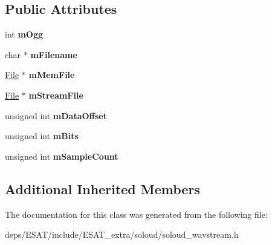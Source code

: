 \subsection*{Public Attributes}
\begin{DoxyCompactItemize}
\item 
\mbox{\label{class_so_loud_1_1_wav_stream_a2dcf2c2ca18a7002c508628a470b55cd}} 
int {\bfseries m\+Ogg}
\item 
\mbox{\label{class_so_loud_1_1_wav_stream_abb044202f928f511f5b8904ea5372915}} 
char $\ast$ {\bfseries m\+Filename}
\item 
\mbox{\label{class_so_loud_1_1_wav_stream_ac6accb9a54740f5f5b4a7931cb880d61}} 
\mbox{\hyperlink{class_so_loud_1_1_file}{File}} $\ast$ {\bfseries m\+Mem\+File}
\item 
\mbox{\label{class_so_loud_1_1_wav_stream_adf01b657b07d0d0e2a26303998f02b02}} 
\mbox{\hyperlink{class_so_loud_1_1_file}{File}} $\ast$ {\bfseries m\+Stream\+File}
\item 
\mbox{\label{class_so_loud_1_1_wav_stream_adf75d044bb547cd1b59b9d4e7774cd45}} 
unsigned int {\bfseries m\+Data\+Offset}
\item 
\mbox{\label{class_so_loud_1_1_wav_stream_aaaaa9cda642e41dc71c3041994803264}} 
unsigned int {\bfseries m\+Bits}
\item 
\mbox{\label{class_so_loud_1_1_wav_stream_a2437070c8bbdee98c3bc12380ed4f81f}} 
unsigned int {\bfseries m\+Sample\+Count}
\end{DoxyCompactItemize}
\subsection*{Additional Inherited Members}


The documentation for this class was generated from the following file\+:\begin{DoxyCompactItemize}
\item 
deps/\+E\+S\+A\+T/include/\+E\+S\+A\+T\+\_\+extra/soloud/soloud\+\_\+wavstream.\+h\end{DoxyCompactItemize}
